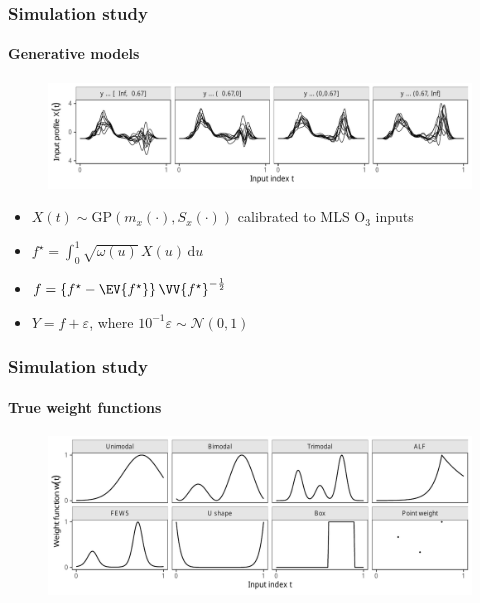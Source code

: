 \documentclass[handout]{snedecorbeamer}
\begin{document}
\begin{frame}
  \frametitle{Simulation study}
  \framesubtitle{Generative models}

  \begin{figure}
    \centering
    \includegraphics[width=\textwidth]{inc/syn01-inputs}
  \end{figure}

  \vspace{\fill}%

  \begin{itemize}
  \item $X(t)\sim\mathrm{GP}(m_x(\cdot), S_x(\cdot))$ calibrated to MLS O$_3$
    inputs
  \item $f^\star = \int_0^1 \sqrt{\omega(u)}\,X(u)\,\mathrm{d}u$
  \item $f = \left\{
      f^\star - \EV{f^\star}
    \right\} \VV{f^\star}^{-\frac{1}{2}}$
  \item $Y = f + \varepsilon$,
    where ${10}^{-1}\varepsilon\sim\mathcal{N}(0, 1)$
  \end{itemize}
\end{frame}

\begin{frame}
  \frametitle{Simulation study}
  \framesubtitle{True weight functions
    \hyperlink{frm:simulation-true}{}
  }

  \begin{figure}
    \centering
    \includegraphics[width=1\textwidth]{syn01-weight-true}
  \end{figure}
\end{frame}
\end{document}
